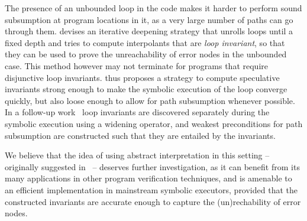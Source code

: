 { The presence of an unbounded loop in the code makes it harder to perform sound subsumption at program locations in it, as a very large number of paths can go through them. \cite{McMillan10} devises an iterative deepening strategy that unrolls loops until a fixed depth and tries to compute interpolants that are {\em loop invariant}, so that they can be used to prove the unreachability of error nodes in the unbounded case. This method however may not terminate for programs that require disjunctive loop invariants. \cite{JNS11} thus proposes a strategy to compute speculative invariants strong enough to make the symbolic execution of the loop converge quickly, but also loose enough to allow for path subsumption whenever possible. In a follow-up work~\cite{JMN12} loop invariants are discovered separately during the symbolic execution using a widening operator, and weakest preconditions for path subsumption are constructed such that they are entailed by the invariants.

We believe that the idea of using abstract interpretation in this setting -- originally suggested in~\cite{JSV09} -- deserves further investigation, as it can benefit from its many applications in other program verification techniques, and is amenable to an efficient implementation in mainstream symbolic executors, provided that the constructed invariants are accurate enough to capture the (un)rechability of error nodes.}

